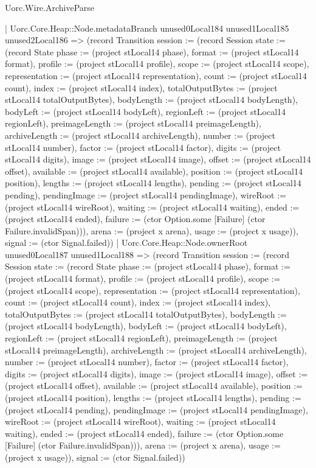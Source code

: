 \begin{lexlean}{Uorc.Wire.ArchiveParse}
\begin{semanticmodule}
{            | Uorc.Core.Heap::Node.metadataBranch unused0Local184 unused1Local185 unused2Local186 => (record Transition {session := (record Session {state := (record State {phase := (project stLocal14 phase), format := (project stLocal14 format), profile := (project stLocal14 profile), scope := (project stLocal14 scope), representation := (project stLocal14 representation), count := (project stLocal14 count), index := (project stLocal14 index), totalOutputBytes := (project stLocal14 totalOutputBytes), bodyLength := (project stLocal14 bodyLength), bodyLeft := (project stLocal14 bodyLeft), regionLeft := (project stLocal14 regionLeft), preimageLength := (project stLocal14 preimageLength), archiveLength := (project stLocal14 archiveLength), number := (project stLocal14 number), factor := (project stLocal14 factor), digits := (project stLocal14 digits), image := (project stLocal14 image), offset := (project stLocal14 offset), available := (project stLocal14 available), position := (project stLocal14 position), lengths := (project stLocal14 lengths), pending := (project stLocal14 pending), pendingImage := (project stLocal14 pendingImage), wireRoot := (project stLocal14 wireRoot), waiting := (project stLocal14 waiting), ended := (project stLocal14 ended), failure := (ctor Option.some [Failure] (ctor Failure.invalidSpan))}), arena := (project x arena), usage := (project x usage)}), signal := (ctor Signal.failed)})
            | Uorc.Core.Heap::Node.ownerRoot unused0Local187 unused1Local188 => (record Transition {session := (record Session {state := (record State {phase := (project stLocal14 phase), format := (project stLocal14 format), profile := (project stLocal14 profile), scope := (project stLocal14 scope), representation := (project stLocal14 representation), count := (project stLocal14 count), index := (project stLocal14 index), totalOutputBytes := (project stLocal14 totalOutputBytes), bodyLength := (project stLocal14 bodyLength), bodyLeft := (project stLocal14 bodyLeft), regionLeft := (project stLocal14 regionLeft), preimageLength := (project stLocal14 preimageLength), archiveLength := (project stLocal14 archiveLength), number := (project stLocal14 number), factor := (project stLocal14 factor), digits := (project stLocal14 digits), image := (project stLocal14 image), offset := (project stLocal14 offset), available := (project stLocal14 available), position := (project stLocal14 position), lengths := (project stLocal14 lengths), pending := (project stLocal14 pending), pendingImage := (project stLocal14 pendingImage), wireRoot := (project stLocal14 wireRoot), waiting := (project stLocal14 waiting), ended := (project stLocal14 ended), failure := (ctor Option.some [Failure] (ctor Failure.invalidSpan))}), arena := (project x arena), usage := (project x usage)}), signal := (ctor Signal.failed)})
}
\end{semanticmodule}
\end{lexlean}

